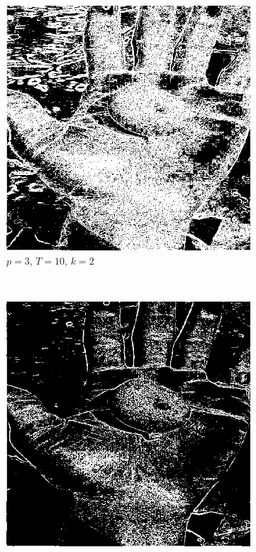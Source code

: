 \documentclass{article}
\begin{document}
\begin{enumerate}[label=(\alph*)]
\begin{figure}
        \begin{subfigure}[b]{0.3\textwidth}
            \includegraphics[width=\textwidth]{img/ED1_3_10.png}
            \caption{$p = 3$, $T = 10$, $k = 2$}
        \end{subfigure}
        ~
        \begin{subfigure}[b]{0.3\textwidth}
            \includegraphics[width=\textwidth]{img/ED1_3_30.png}

\end{subfigure}
\end{figure}
\end{enumerate}
\end{document}
